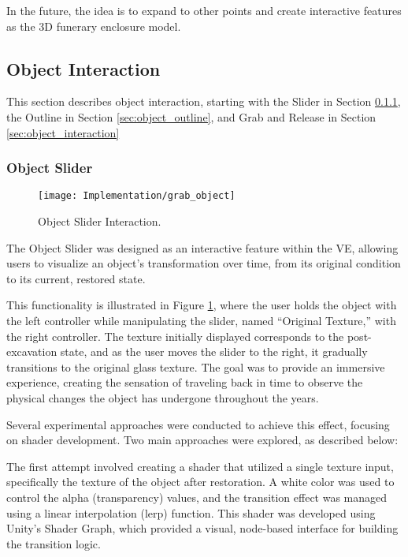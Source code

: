 In the future, the idea is to expand to other points and create interactive features as the \gls{3D} funerary enclosure model. 

\subsection{Object Interaction}
\label{sec:object_interact}
This section describes object interaction, starting with the Slider in Section \ref{sec:object_slider}, the Outline in Section \ref{sec:object_outline}, and Grab and Release in Section \ref{sec:object_interaction}

\subsubsection{Object Slider}
\label{sec:object_slider}

 \begin{figure}[h!]
    \centering
    \texttt{[image: Implementation/grab\_object]}
    \caption{Object Slider Interaction.}
    \label{fig:object_slider}
\end{figure}

The Object Slider was designed as an interactive feature within the \gls{VE}, allowing users to visualize an object's transformation over time, from its original condition to its current, restored state. 

This functionality is illustrated in Figure \ref{fig:object_slider}, where the user holds the object with the left controller while manipulating the slider, named “Original Texture,” with the right controller. 
The texture initially displayed corresponds to the post-excavation state, and as the user moves the slider to the right, it gradually transitions to the original glass texture.
The goal was to provide an immersive experience, creating the sensation of traveling back in time to observe the physical changes the object has undergone throughout the years.

Several experimental approaches were conducted to achieve this effect, focusing on shader development.
Two main approaches were explored, as described below:

The first attempt involved creating a shader that utilized a single texture input, specifically the texture of the object after restoration. A white color was used to control the alpha (transparency) values, and the transition effect was managed using a linear interpolation (lerp) function. This shader was developed using Unity’s Shader Graph, which provided a visual, node-based interface for building the transition logic.


